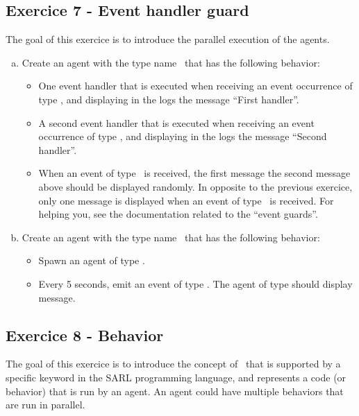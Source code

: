 \documentclass[english,nodocumentinfo,nopubpage]{utbmciadreport}
\begin{document}
\subsection{Exercice 7 - Event handler guard}

The goal of this exercice is to introduce the parallel execution of the agents.

\begin{enumerate}[a)]
\item Create an agent with the type name \ that has the following behavior:
	\begin{itemize}
	\item One event handler that is executed when receiving an event occurrence of type , and displaying in the logs the message ``First handler''.
	\item A second event handler that is executed when receiving an event occurrence of type , and displaying in the logs the message ``Second handler''.
	\item When an event of type \ is received, the first message  the second message above should be displayed randomly. In opposite to the previous exercice, only one message is displayed when an event of type \ is received. For helping you, see the documentation related to the ``event guards''.
	\end{itemize}
\item Create an agent with the type name \ that has the following behavior:
	\begin{itemize}
	\item Spawn an agent of type .
	\item Every 5 seconds, emit an event of type . The agent of type  should display  message.
	\end{itemize}
\end{enumerate}


\subsection{Exercice 8 - Behavior}

The goal of this exercice is to introduce the concept of \ that is supported by a specific keyword in the SARL programming language, and represents a code (or behavior) that is run by an agent. An agent could have multiple behaviors that are run in parallel.
\end{document}

